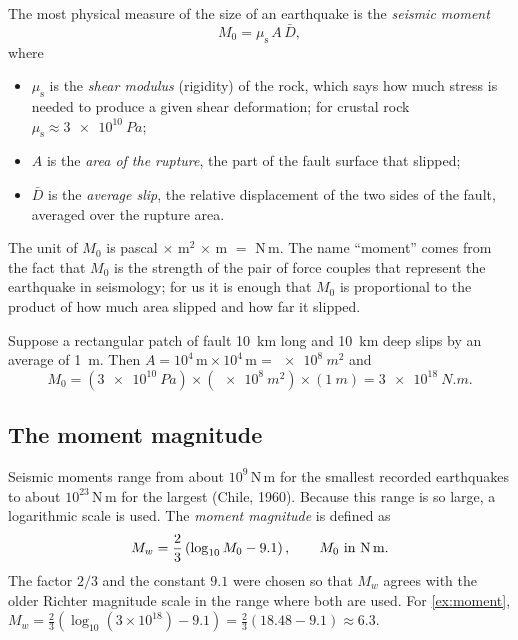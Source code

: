 The most physical measure of the size of an earthquake is the \emph{seismic moment}
\begin{equation}
  M_0 = \mu_{\mathrm s}\, A\, \bar D ,
  \label{eq:M0}
\end{equation}
where
\begin{itemize}[nosep]
  \item $\mu_{\mathrm s}$ is the \emph{shear modulus} (rigidity) of the rock, which says how much
    stress is needed to produce a given shear deformation; for crustal rock
    $\mu_{\mathrm s}\approx\SI{3e10}{Pa}$;
  \item $A$ is the \emph{area of the rupture}, the part of the fault surface that slipped;
  \item $\bar D$ is the \emph{average slip}, the relative displacement of the two sides of the
    fault, averaged over the rupture area.
\end{itemize}
The unit of $M_0$ is pascal $\times$ m$^2$ $\times$ m $=$ N\,m. The name ``moment'' comes from the
fact that $M_0$ is the strength of the pair of force couples that represent the earthquake
in seismology; for us it is enough that $M_0$ is proportional to the product of how much area
slipped and how far it slipped.

\begin{example}
\label{ex:moment}
Suppose a rectangular patch of fault \SI{10}{km} long and \SI{10}{km} deep slips by an average
of \SI{1}{m}. Then $A = 10^4\,\text{m}\times10^4\,\text{m} = \SI{e8}{m^2}$ and
\[
  M_0 = (\SI{3e10}{Pa})\times(\SI{e8}{m^2})\times(\SI{1}{m}) = \SI{3e18}{N.m}.
\]
\end{example}

\subsection{The moment magnitude}

Seismic moments range from about $10^{9}$\,N\,m for the smallest recorded earthquakes to about
$10^{23}$\,N\,m for the largest (Chile, 1960). Because this range is so large, a logarithmic scale
is used. The \emph{moment magnitude} is defined as~\cite{HanksKanamori1979}
\begin{equation}
  M_w = \frac{2}{3}\left(\log_{10} M_0 - 9.1\right), \qquad M_0 \text{ in N\,m}.
  \label{eq:Mw}
\end{equation}
The factor $2/3$ and the constant $9.1$ were chosen so that $M_w$ agrees with the older Richter
magnitude scale in the range where both are used. For \cref{ex:moment},
$M_w = \tfrac23(\log_{10}(3\times10^{18}) - 9.1) = \tfrac23(18.48-9.1) \approx 6.3$.

